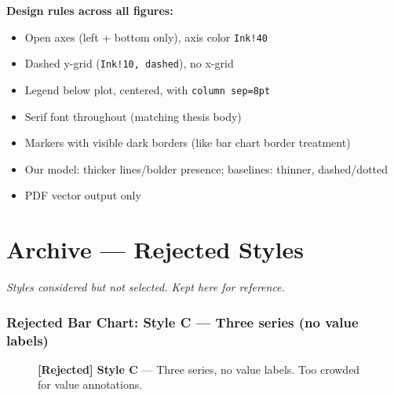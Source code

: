 \documentclass[11pt, a4paper]{article}
\begin{document}
\bigskip

\noindent\textbf{Design rules across all figures:}
\begin{itemize}
\item Open axes (left + bottom only), axis color \texttt{Ink!40}
\item Dashed y-grid (\texttt{Ink!10, dashed}), no x-grid
\item Legend below plot, centered, with \texttt{column sep=8pt}
\item Serif font throughout (matching thesis body)
\item Markers with visible dark borders (like bar chart border treatment)
\item Our model: thicker lines/bolder presence; baselines: thinner, dashed/dotted
\item PDF vector output only
\end{itemize}


\newpage


\part*{Archive — Rejected Styles}

\textit{Styles considered but not selected. Kept here for reference.}

\bigskip

\section{Rejected Bar Chart: Style C — Three series (no value labels)}

\begin{figure}[h]
\centering
{}
\caption{\textbf{[Rejected] Style C} --- Three series, no value labels. Too crowded for value annotations.}
\label{fig:bar-c-archive}
\end{figure}
\end{document}
